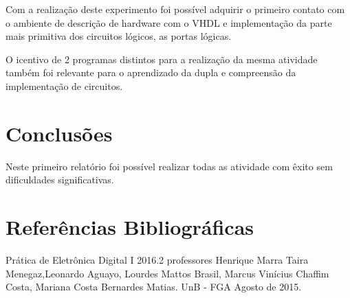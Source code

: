 \documentclass[12pts]{article}
\begin{document}
	Com a realização deste experimento foi possível adquirir o primeiro contato com o ambiente de descrição de hardware com o VHDL e implementação da parte mais primitiva dos circuitos lógicos, as portas lógicas.
	
	O icentivo de 2 programas distintos para a realização da mesma atividade também foi relevante para o aprendizado da dupla e compreensão da implementação de circuitos.

\section{Conclusões}

	Neste primeiro relatório foi possível realizar todas as atividade com êxito sem dificuldades significativas.

\section{Referências Bibliográficas}

Prática de Eletrônica Digital I 2016.2 professores Henrique Marra Taira Menegaz,Leonardo Aguayo, Lourdes Mattos Brasil, Marcus Vinícius Chaffim Costa, Mariana Costa Bernardes Matias. UnB - FGA Agosto de 2015.

\newpage
\end{document}
